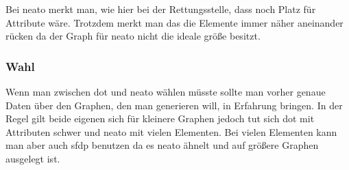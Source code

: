 \noindent
Bei neato merkt man, wie hier bei der Rettungsstelle, dass noch Platz für Attribute wäre. Trotzdem merkt man das die Elemente immer näher aneinander rücken da der Graph für neato nicht die ideale größe besitzt.

\subsubsection{Wahl}
\fib{}
\noindent
Wenn man zwischen dot und neato wählen müsste sollte man vorher genaue Daten über den Graphen, den man generieren will, in Erfahrung bringen. In der Regel gilt beide eigenen sich für kleinere Graphen jedoch tut sich dot mit Attributen schwer und neato mit vielen Elementen. Bei vielen Elementen kann man aber auch sfdp benutzen da es neato ähnelt und auf größere Graphen ausgelegt ist.